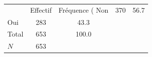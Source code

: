 {
\def\sym#1{\ifmmode^{#1}\else\(^{#1}\)\fi}
\begin{tabular}{l*{1}{cc}}
\toprule
            &    Effectif&Fréquence (%
\midrule
Non         &         370&        56.7\\
Oui         &         283&        43.3\\
Total       &         653&       100.0\\
\midrule
\(N\)       &         653&            \\
\bottomrule
\end{tabular}
}
